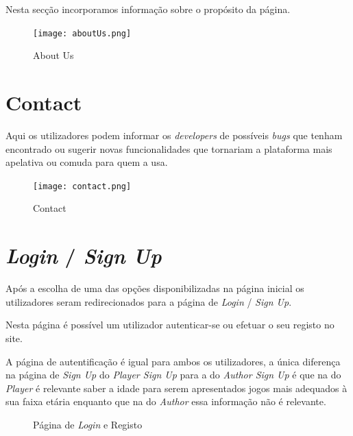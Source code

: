 \documentclass[11pt,a4paper]{report}
\begin{document}
Nesta secção incorporamos informação sobre o propósito da página.\newline

\begin{figure}[h]
    \centering
    \texttt{[image: aboutUs.png]}
    \caption{About Us}
    \label{fig:abUs}
\end{figure}

\section{Contact}

Aqui os utilizadores podem informar os \emph{developers} de possíveis \emph{bugs} que tenham encontrado ou sugerir novas funcionalidades que tornariam a plataforma mais apelativa ou comuda para quem a usa.

\begin{figure}[h]
    \centering
    \texttt{[image: contact.png]}
    \caption{Contact}
    \label{fig:cont}
\end{figure}

\section{\emph{Login} / \emph{Sign Up}}
Após a escolha de uma das opções disponibilizadas na página inicial os utilizadores seram redirecionados para a página de \emph{Login} / \emph{Sign Up}. 

Nesta página é possível um utilizador autenticar-se ou efetuar o seu registo no site. 

A página de autentificação é igual para ambos os utilizadores, a única diferença na página de \emph{Sign Up} do \emph{Player Sign Up} para a do \emph{Author Sign Up} é que na do \emph{Player} é relevante saber a idade para serem apresentados jogos mais adequados à sua faixa etária enquanto que na do \emph{Author} essa informação não é relevante.\newline\newline

\begin{figure}[h]%
    \centering
    \qquad
    \qquad
    \caption{Página de \emph{Login} e Registo}%
    \label{fig:log&sigUp}%
\end{figure}
\end{document}
